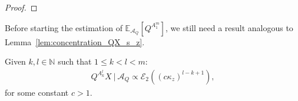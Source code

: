 \documentclass[a4papaer, titlepage]{book}
\begin{document}
\begin{proof}
\end{proof}
Before starting the estimation of $\mathbb E_{\mathcal A_Q}[Q^{A_1^m}]$, we still need a result analogous to Lemma~\ref{lem:concentration_QX_s_z}.
\begin{lemma}\label{lem:concentration_QmX^A}
  Given $k,l \in \mathbb N$ such that $1\leq k<l <m$:
  \begin{align*}
    Q^{A_k^l}X  \ | \ \mathcal A_Q \propto \mathcal E_2 \left((c\kappa_z)^{l-k+1}  \right),
  \end{align*}
  for some constant $c>1$.
\end{lemma}
\end{document}
